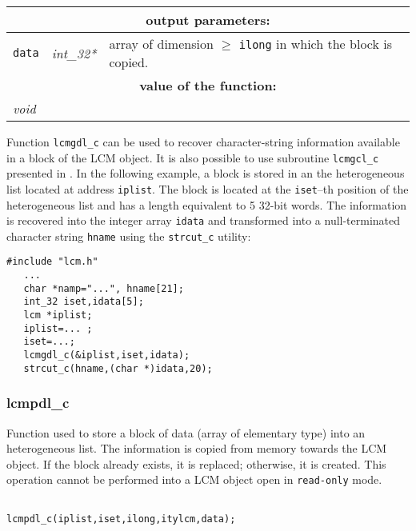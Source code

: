 \vskip 0.8cm

\noindent
\begin{tabular}{|p{1.5cm}|p{2cm}|p{11cm}|}
\hline
\multicolumn{3}{|c|}{\bf output parameters:} \\
\hline
{\tt data} & {\it int\_32*} & array of dimension $\ge$ {\tt ilong} in which the block is copied. \\
\hline
\multicolumn{3}{|c|}{\bf value of the function:} \\
\hline
\multicolumn{2}{|l|}{\it void} &  \\
\hline
\end{tabular}

\vskip 0.4cm

Function {\tt lcmgdl\_c} can be used to recover character-string information available in a block
of the LCM object. It is also possible to use subroutine {\tt lcmgcl\_c} presented in . In the following example, a block is stored in an the heterogeneous list located at
address {\tt iplist}. The block is located at the {\tt iset}--th position of the heterogeneous list and has a length equivalent to 5 32-bit words.
The information is recovered into the integer array {\tt idata} and transformed into a null-terminated
character string {\tt hname}  using the {\tt strcut\_c} utility:

\begin{verbatim}
#include "lcm.h"
   ...
   char *namp="...", hname[21];
   int_32 iset,idata[5];
   lcm *iplist;
   iplist=... ;
   iset=...;
   lcmgdl_c(&iplist,iset,idata);
   strcut_c(hname,(char *)idata,20);
\end{verbatim}

\subsubsection{lcmpdl\_c}

Function used to store a block of data (array of elementary type) into an heterogeneous list. 
The information is copied from memory towards the LCM object. If the block already exists, it is replaced;
otherwise, it is created. This operation cannot be performed into a LCM object open in {\tt read-only} mode.

\begin{verbatim}

lcmpdl_c(iplist,iset,ilong,itylcm,data);
\end{verbatim}

\vskip 0.2cm

